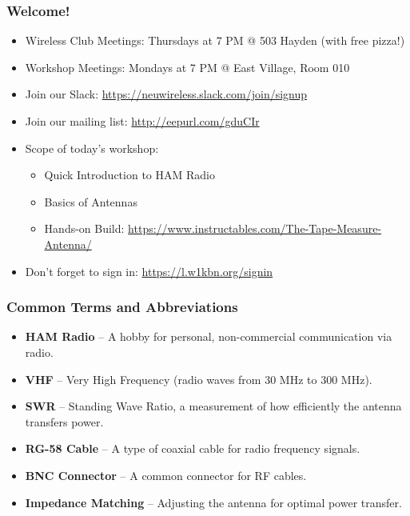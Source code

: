 \documentclass{beamer}
\begin{document}
\begin{frame}
    \frametitle{Welcome!}
    \begin{itemize}
        \item Wireless Club Meetings: Thursdays at 7 PM @ 503 Hayden (with free pizza!)
        \item Workshop Meetings: Mondays at 7 PM @ East Village, Room 010
        \item Join our Slack: \url{https://neuwireless.slack.com/join/signup}
        \item Join our mailing list: \url{http://eepurl.com/gduCIr}
        \item Scope of today's workshop:
        \begin{itemize}
            \item Quick Introduction to HAM Radio
            \item Basics of Antennas
            \item Hands-on Build: \url{https://www.instructables.com/The-Tape-Measure-Antenna/}
        \end{itemize}
        \item Don’t forget to sign in: \url{https://l.w1kbn.org/signin}
    \end{itemize}
\end{frame}

\begin{frame}
    \frametitle{Common Terms and Abbreviations}
    \begin{itemize}
        \item \textbf{HAM Radio} – A hobby for personal, non-commercial communication via radio.
        \item \textbf{VHF} – Very High Frequency (radio waves from 30 MHz to 300 MHz).
        \item \textbf{SWR} – Standing Wave Ratio, a measurement of how efficiently the antenna transfers power.
        \item \textbf{RG-58 Cable} – A type of coaxial cable for radio frequency signals.
        \item \textbf{BNC Connector} – A common connector for RF cables.
        \item \textbf{Impedance Matching} – Adjusting the antenna for optimal power transfer.
    \end{itemize}
\end{frame}
\end{document}
